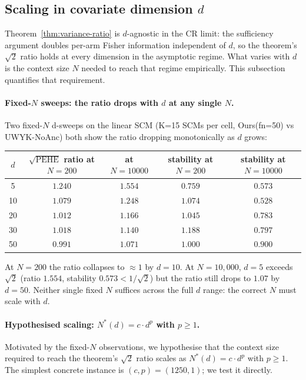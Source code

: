 \documentclass[11pt]{article}
\theoremstyle{remark}
\begin{document}
\subsection{Scaling in covariate dimension $d$}
\label{subsec:scaling-d}

Theorem~\ref{thm:variance-ratio} is $d$-agnostic in the CR limit: the
sufficiency argument doubles per-arm Fisher information independent
of $d$, so the theorem's $\sqrt{2}$ ratio holds at every dimension in
the asymptotic regime. What varies with $d$ is the context size $N$
needed to reach that regime empirically. This subsection quantifies
that requirement.

\paragraph{Fixed-$N$ sweeps: the ratio drops with $d$ at any single $N$.}
Two fixed-$N$ d-sweeps on the linear SCM (K=15 SCMs per cell,
Ours(fn=50) vs UWYK-NoAnc) both show the ratio dropping monotonically
as $d$ grows:
\begin{center}
\begin{tabular}{ccccc}
\toprule
$d$ & $\sqrt{\mathrm{PEHE}}$ ratio at $N=200$ & at $N=10000$ &
      stability at $N=200$ & stability at $N=10000$ \\
\midrule
5   & $1.240$ & $\mathbf{1.554}$ & $0.759$ & $\mathbf{0.573}$ \\
10  & $1.079$ & $1.248$          & $1.074$ & $0.528$ \\
20  & $1.012$ & $1.166$          & $1.045$ & $0.783$ \\
30  & $1.018$ & $1.140$          & $1.188$ & $0.797$ \\
50  & $0.991$ & $1.071$          & $1.000$ & $0.900$ \\
\bottomrule
\end{tabular}
\end{center}
At $N=200$ the ratio collapses to $\approx 1$ by $d=10$. At
$N=10{,}000$, $d=5$ exceeds $\sqrt{2}$ (ratio $1.554$, stability
$0.573 < 1/\sqrt{2}$) but the ratio still drops to $1.07$ by $d=50$.
Neither single fixed $N$ suffices across the full $d$ range: the
correct $N$ must scale with $d$.

\paragraph{Hypothesised scaling: $N^*(d) = c \cdot d^p$ with $p \geq 1$.}
Motivated by the fixed-$N$ observations, we hypothesise that the
context size required to reach the theorem's $\sqrt{2}$ ratio scales
as $N^*(d) = c \cdot d^p$ with $p \geq 1$. The simplest concrete
instance is $(c, p) = (1250, 1)$; we test it directly.
\end{document}
